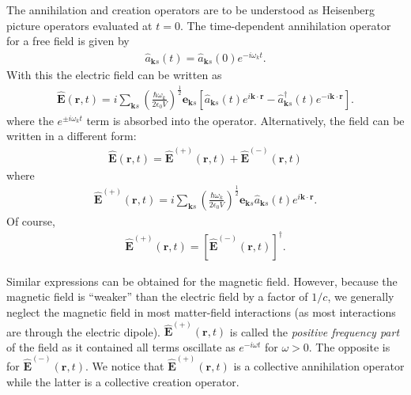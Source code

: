 \documentclass{book}
\theoremstyle{definition}
\newcommand{\f}[2]{\frac{#1}{#2}}
\newcommand{\lp}{\left(}
\newcommand{\rp}{\right)}
\newcommand{\lb}{\left[}
\newcommand{\rb}{\right]}
\begin{document}
The annihilation and creation operators are to be understood as Heisenberg picture operators evaluated at $t=0$. The time-dependent annihilation operator for a free field is given by  
\begin{align}
\hat{a}_{\mathbf{k}s}(t) = \hat{a}_{\mathbf{k}s}(0)e^{-i\omega_k t}.
\end{align}
With this the electric field can be written as
\begin{align}
\hat{\mathbf{E}}(\mathbf{r},t) = i\sum_{\mathbf{k}s}\lp \f{\hbar\omega_k}{2\epsilon_0 V} \rp^{\f{1}{2}} \mathbf{e}_{\mathbf{k}s}   \lb \hat{a}_{\mathbf{k}s}(t)e^{i\mathbf{k}\cdot\mathbf{r}} - \hat{a}^\dagger_{\mathbf{k}s}(t)e^{-i\mathbf{k}\cdot\mathbf{r}} \rb.
\end{align}
where the $e^{\pm i \omega_k t}$ term is absorbed into the operator. Alternatively, the field can be written in a different form:
\begin{align}
\hat{\mathbf{E}}(\mathbf{r},t) = \hat{\mathbf{E}}^{(+)}(\mathbf{r},t) + \hat{\mathbf{E}}^{(-)}(\mathbf{r},t)
\end{align}
where
\begin{align}
\hat{\mathbf{E}}^{(+)}(\mathbf{r},t) = i\sum_{\mathbf{k}s}\lp \f{\hbar\omega_k}{2\epsilon_0 V} \rp^{\f{1}{2}}\mathbf{e}_{\mathbf{k}s}\hat{a}_{\mathbf{k}s}(t)e^{ i\mathbf{k}\cdot\mathbf{r}}.
\end{align}
Of course,
\begin{align}
\hat{\mathbf{E}}^{(+)}(\mathbf{r},t) = \lb \hat{\mathbf{E}}^{(-)}(\mathbf{r},t) \rb^\dagger.
\end{align}

Similar expressions can be obtained for the magnetic field. However, because the magnetic field is ``weaker'' than the electric field by a factor of $1/c$, we generally neglect the magnetic field in most matter-field interactions (as most interactions are through the electric dipole). $\hat{\mathbf{E}}^{(+)}(\mathbf{r},t)$ is called the \textit{positive frequency part} of the field as it contained all terms oscillate as $e^{-i\omega t}$ for $\omega > 0$. The opposite is for $\hat{\mathbf{E}}^{(-)}(\mathbf{r},t)$. We notice that $\hat{\mathbf{E}}^{(+)}(\mathbf{r},t)$ is a collective annihilation operator while the latter is a collective creation operator. \\
\end{document}
